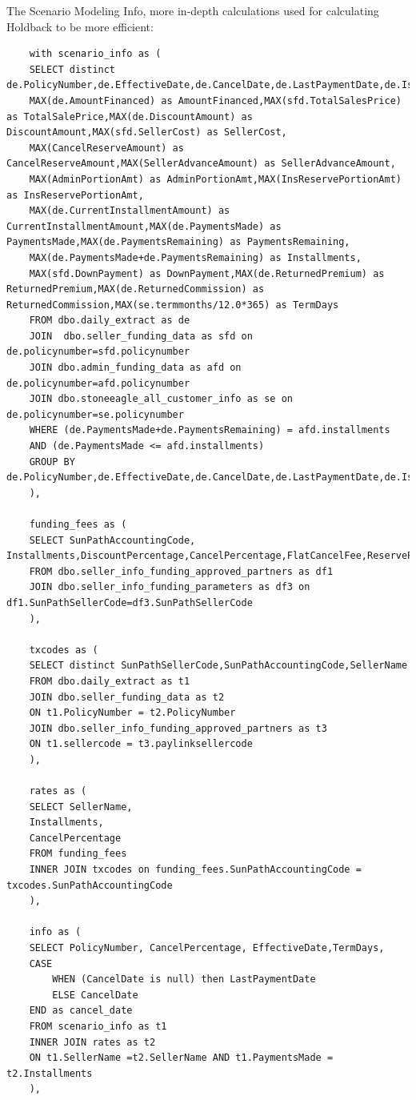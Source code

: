 \documentclass[titlepage]{article}
\begin{document}
\begin{appendices}
	The Scenario Modeling Info, more in-depth calculations used for calculating Holdback to be more efficient:
	\label{appendix:sql6}
	\begin{verbatim}
	with scenario_info as (
	SELECT distinct de.PolicyNumber,de.EffectiveDate,de.CancelDate,de.LastPaymentDate,de.IsCancelled,de.FundCo,sfd.SellerName,
	MAX(de.AmountFinanced) as AmountFinanced,MAX(sfd.TotalSalesPrice) as TotalSalePrice,MAX(de.DiscountAmount) as DiscountAmount,MAX(sfd.SellerCost) as SellerCost,
	MAX(CancelReserveAmount) as CancelReserveAmount,MAX(SellerAdvanceAmount) as SellerAdvanceAmount,
	MAX(AdminPortionAmt) as AdminPortionAmt,MAX(InsReservePortionAmt) as InsReservePortionAmt,
	MAX(de.CurrentInstallmentAmount) as CurrentInstallmentAmount,MAX(de.PaymentsMade) as PaymentsMade,MAX(de.PaymentsRemaining) as PaymentsRemaining,
	MAX(de.PaymentsMade+de.PaymentsRemaining) as Installments,
	MAX(sfd.DownPayment) as DownPayment,MAX(de.ReturnedPremium) as ReturnedPremium,MAX(de.ReturnedCommission) as ReturnedCommission,MAX(se.termmonths/12.0*365) as TermDays
	FROM dbo.daily_extract as de
	JOIN  dbo.seller_funding_data as sfd on de.policynumber=sfd.policynumber
	JOIN dbo.admin_funding_data as afd on de.policynumber=afd.policynumber
	JOIN dbo.stoneeagle_all_customer_info as se on de.policynumber=se.policynumber
	WHERE (de.PaymentsMade+de.PaymentsRemaining) = afd.installments
	AND (de.PaymentsMade <= afd.installments)
	GROUP BY de.PolicyNumber,de.EffectiveDate,de.CancelDate,de.LastPaymentDate,de.IsCancelled,de.FundCo,sfd.SellerName
	),
	
	funding_fees as (
	SELECT SunPathAccountingCode, Installments,DiscountPercentage,CancelPercentage,FlatCancelFee,ReservePercentage
	FROM dbo.seller_info_funding_approved_partners as df1
	JOIN dbo.seller_info_funding_parameters as df3 on df1.SunPathSellerCode=df3.SunPathSellerCode
	),
	
	txcodes as (
	SELECT distinct SunPathSellerCode,SunPathAccountingCode,SellerName
	FROM dbo.daily_extract as t1
	JOIN dbo.seller_funding_data as t2
	ON t1.PolicyNumber = t2.PolicyNumber
	JOIN dbo.seller_info_funding_approved_partners as t3
	ON t1.sellercode = t3.paylinksellercode
	),
	
	rates as (
	SELECT SellerName,
	Installments,
	CancelPercentage
	FROM funding_fees
	INNER JOIN txcodes on funding_fees.SunPathAccountingCode = txcodes.SunPathAccountingCode
	),
	
	info as (
	SELECT PolicyNumber, CancelPercentage, EffectiveDate,TermDays,
	CASE
		WHEN (CancelDate is null) then LastPaymentDate
		ELSE CancelDate
	END as cancel_date
	FROM scenario_info as t1
	INNER JOIN rates as t2
	ON t1.SellerName =t2.SellerName AND t1.PaymentsMade = t2.Installments
	),
	

\end{verbatim}
\end{appendices}
\end{document}
